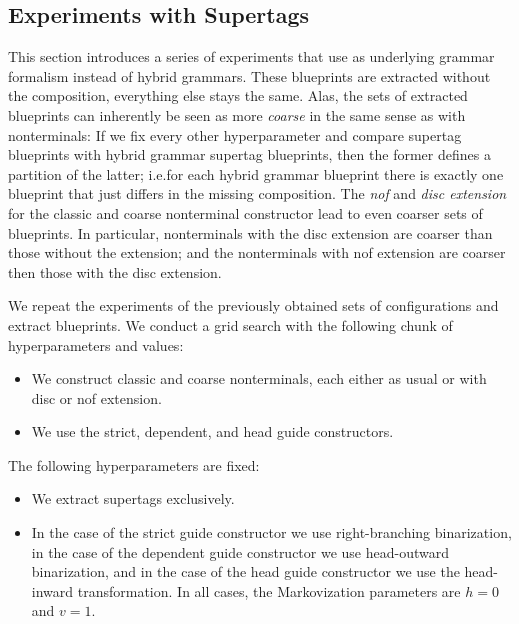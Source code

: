 \documentclass[../../document.tex]{subfiles}
\begin{document}
    \subsection{Experiments with  Supertags}\label{sec:gridsearch:dcp}
    This section introduces a series of experiments that use  as underlying grammar formalism instead of hybrid grammars.
    These blueprints are extracted without the  composition, everything else stays the same.
    Alas, the sets of extracted blueprints can inherently be seen as more \emph{coarse} in the same sense as with nonterminals:
        If we fix every other hyperparameter and compare  supertag blueprints with hybrid grammar supertag blueprints, then the former defines a partition of the latter; i.e.\@ for each hybrid grammar blueprint there is exactly one  blueprint that just differs in the missing composition.
    The \emph{nof} and \emph{disc extension} for the classic and coarse nonterminal constructor lead to even coarser sets of blueprints.
    In particular, nonterminals with the disc extension are coarser than those without the extension; and the nonterminals with nof extension are coarser then those with the disc extension.

    We repeat the experiments of the previously obtained sets of configurations and extract  blueprints.
    We conduct a grid search with the following chunk of hyperparameters and values:
    \begin{itemize}
        \item We construct classic and coarse nonterminals, each either as usual or with disc or nof extension.
        \item We use the strict, dependent, and head guide constructors.
    \end{itemize}
    The following hyperparameters are fixed:
    \begin{itemize}
        \item We extract  supertags exclusively.
        \item In the case of the strict guide constructor we use right-branching binarization, in the case of the dependent guide constructor we use head-outward binarization, and in the case of the head guide constructor we use the head-inward transformation. In all cases, the Markovization parameters are $h=0$ and $v=1$.
    \end{itemize}
\end{document}
